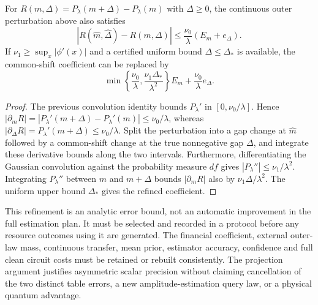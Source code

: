 \begin{proposition}
\label{prop:raw-common-shift-refinement}
For $R(m,\Delta)=P_\lambda(m+\Delta)-P_\lambda(m)$ with
$\Delta\geq0$, the continuous outer perturbation above also satisfies
\begin{equation}
 |R(\widehat m,\widehat\Delta)-R(m,\Delta)|
 \leq\frac{\nu_0}{\lambda}(E_m+e_\Delta).
\end{equation}
If $\nu_1\geq\sup_x|\phi'(x)|$ and a certified uniform bound
$\Delta\leq\Delta_*$ is available, the common-shift coefficient
can be replaced by
\begin{equation}
 \min\left\{\frac{\nu_0}{\lambda},
              \frac{\nu_1\Delta_*}{\lambda^2}\right\}E_m
       +\frac{\nu_0}{\lambda}e_\Delta.
\end{equation}
\end{proposition}
\begin{proof}
The previous convolution identity bounds $P_\lambda'$ in
$[0,\nu_0/\lambda]$. Hence
$|\partial_mR|=|P_\lambda'(m+\Delta)-P_\lambda'(m)|
\leq\nu_0/\lambda$, whereas
$|\partial_\Delta R|=P_\lambda'(m+\Delta)\leq\nu_0/\lambda$.
Split the perturbation into a gap change at $\widehat m$ followed by
a common-shift change at the true nonnegative gap $\Delta$, and
integrate these derivative bounds along the two intervals. Furthermore,
differentiating the Gaussian convolution against the probability
measure $df$ gives $|P_\lambda''|\leq\nu_1/\lambda^2$.
Integrating $P_\lambda''$ between $m$ and $m+\Delta$ bounds
$|\partial_mR|$ also by $\nu_1\Delta/\lambda^2$.
The uniform upper bound $\Delta_*$ gives the refined coefficient.
\end{proof}

This refinement is an analytic error bound, not an automatic improvement
in the full estimation plan. It must be selected and recorded in a
protocol before any resource outcomes using it are generated. The
financial coefficient, external outer-law mass, continuous transfer,
mean prior, estimator accuracy, confidence and full clean circuit costs
must be retained or rebuilt consistently. The projection argument
justifies asymmetric scalar precision without claiming cancellation of
the two distinct table errors, a new amplitude-estimation query law, or
a physical quantum advantage.
